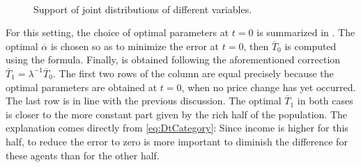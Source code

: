 \documentclass[english, a4paper, 12pt]{article}
\begin{document}
	\begin{figure}[H]
		\caption{Support of joint distributions of different variables.}
		\label{fig:JointDistribsCategory}
		
		
		\,
		
	\end{figure}
For this setting, the choice of optimal parameters at $t = 0$ is summarized in . The optimal $\overline{\alpha}$ is chosen so as to minimize the error at $t = 0$, then $\overline{T}_{0}$ is computed using the formula. Finally, is obtained following the aforementioned correction $\overline{T}_{1} = \lambda^{-1}\overline{T}_{0}$. The first two rows of the column are equal precisely because the optimal parameters are obtained at $t =0$, when no price change has yet occurred. The last row is in line with the previous discussion. The optimal $\overline{T}_{1}$ in both cases is closer to the more constant part given by the rich half of the population. The explanation comes directly from \eqref{eq:DtCategory}: Since income is higher for this half, to reduce the error to zero is more important to diminish the difference for these agents than for the other half. 
\end{document}
